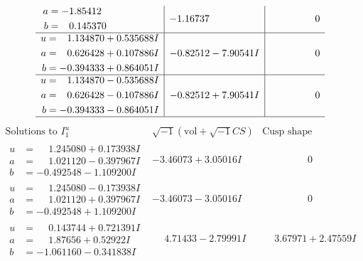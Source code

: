 \documentclass[1p]{elsarticle_modified}
\theoremstyle{definition}
\newcommand{\I}{\sqrt{-1}}
\begin{document}
$$\begin{array}{c|c|c}
\begin{aligned}
a &= -1.85412\phantom{ +0.000000I} \\
b &= \phantom{-}0.145370\phantom{ +0.000000I}\end{aligned}
 & -1.16737\phantom{ +0.000000I} & \phantom{-0.000000 } 0 \\ \hline\begin{aligned}
u &= \phantom{-}1.134870 + 0.535688 I \\
a &= \phantom{-}0.626428 + 0.107886 I \\
b &= -0.394333 + 0.864051 I\end{aligned}
 & -0.82512 - 7.90541 I & \phantom{-0.000000 } 0 \\ \hline\begin{aligned}
u &= \phantom{-}1.134870 - 0.535688 I \\
a &= \phantom{-}0.626428 - 0.107886 I \\
b &= -0.394333 - 0.864051 I\end{aligned}
 & -0.82512 + 7.90541 I & \phantom{-0.000000 } 0\\
 \hline 
 \end{array}$$\newpage$$\begin{array}{c|c|c}  
\text{Solutions to }I^u_{1}& \I (\text{vol} + \sqrt{-1}CS) & \text{Cusp shape}\\
 \hline 
\begin{aligned}
u &= \phantom{-}1.245080 + 0.173938 I \\
a &= \phantom{-}1.021120 - 0.397967 I \\
b &= -0.492548 - 1.109200 I\end{aligned}
 & -3.46073 + 3.05016 I & \phantom{-0.000000 } 0 \\ \hline\begin{aligned}
u &= \phantom{-}1.245080 - 0.173938 I \\
a &= \phantom{-}1.021120 + 0.397967 I \\
b &= -0.492548 + 1.109200 I\end{aligned}
 & -3.46073 - 3.05016 I & \phantom{-0.000000 } 0 \\ \hline\begin{aligned}
u &= \phantom{-}0.143744 + 0.721391 I \\
a &= \phantom{-}1.87656 + 0.52922 I \\
b &= -1.061160 - 0.341838 I\end{aligned}
 & \phantom{-}4.71433 - 2.79991 I & \phantom{-}3.67971 + 2.47559 I \\ \hline\begin{aligned}

\end{aligned}
\end{array}$$
\end{document}
